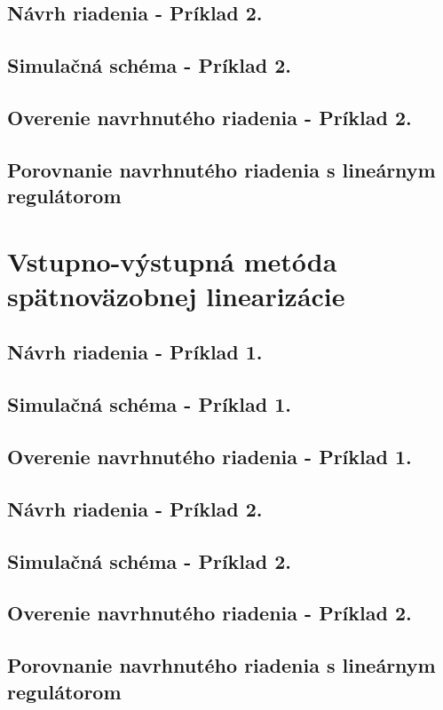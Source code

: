 \subsection{Návrh riadenia - Príklad 2.}
\subsection{Simulačná schéma - Príklad 2.}
\subsection{Overenie navrhnutého riadenia - Príklad 2.}
\subsection{Porovnanie navrhnutého riadenia s lineárnym regulátorom}

\newpage
\section{Vstupno-výstupná metóda spätnoväzobnej linearizácie}
\subsection{Návrh riadenia - Príklad 1.}
\subsection{Simulačná schéma - Príklad 1.}
\subsection{Overenie navrhnutého riadenia - Príklad 1.}
\subsection{Návrh riadenia - Príklad 2.}
\subsection{Simulačná schéma - Príklad 2.}
\subsection{Overenie navrhnutého riadenia - Príklad 2.}
\subsection{Porovnanie navrhnutého riadenia s lineárnym regulátorom}



